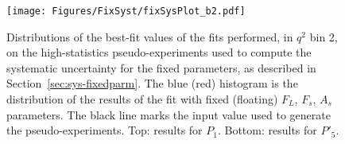 
\begin{figure}[!hbt]
  \centering
  \texttt{[image: Figures/FixSyst/fixSysPlot\_b2.pdf]}
  \caption{Distributions of the best-fit values of the fits performed, in $q^2$ bin 2, on the high-statistics pseudo-experiments used to compute the systematic uncertainty for the fixed parameters, as described in Section~\ref{sec:sys-fixedparm}. The blue (red) histogram is the distribution of the results of the fit with fixed (floating) $F_L$, $F_s$, $A_s$ parameters. The black line marks the input value used to generate the pseudo-experiments. Top: results for $P_1$. Bottom: results for $P'_5$. }
  \label{fig:fixSyst2}
\end{figure}



